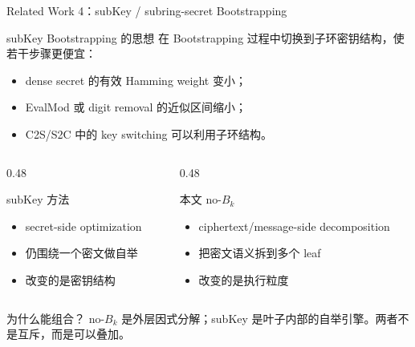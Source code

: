 \documentclass[aspectratio=169, 10pt, xcolor=svgnames, table, UTF8]{ctexbeamer}
\begin{document}
\begin{frame}{Related Work 4：subKey / subring-secret Bootstrapping}
  \begin{block}{subKey Bootstrapping 的思想}
    在 Bootstrapping 过程中切换到子环密钥结构，使若干步骤更便宜：
    \begin{itemize}
      \item dense secret 的有效 Hamming weight 变小；
      \item EvalMod 或 digit removal 的近似区间缩小；
      \item C2S/S2C 中的 key switching 可以利用子环结构。
    \end{itemize}
  \end{block}
  
  \pause
  \begin{columns}
    \begin{column}{0.48\linewidth}
      \begin{block}{subKey 方法}
        \begin{itemize}
          \item secret-side optimization
          \item 仍围绕一个密文做自举
          \item 改变的是密钥结构
        \end{itemize}
      \end{block}
    \end{column}
    \begin{column}{0.48\linewidth}
      \begin{block}{本文 no-\(B_k\)}
        \begin{itemize}
          \item ciphertext/message-side decomposition
          \item 把密文语义拆到多个 leaf
          \item 改变的是执行粒度
        \end{itemize}
      \end{block}
    \end{column}
  \end{columns}
  
  \pause
  \begin{exampleblock}{为什么能组合？}
    no-\(B_k\) 是外层因式分解；subKey 是叶子内部的自举引擎。两者不是互斥，而是可以叠加。
  \end{exampleblock}
\end{frame}
\end{document}
